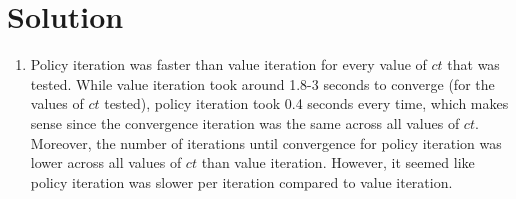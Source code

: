 \documentclass[submit]{../harvardml}
\newenvironment{solution}
  {\color{blue}\section*{Solution}}
{}
\begin{document}
\begin{solution}
\begin{enumerate}
\begin{enumerate}
\begin{figure}[htbp]
{              }\\
            \end{figure}
        \end{enumerate}

        \item Policy iteration was faster than value iteration for every value of $ct$ that was tested. While value iteration took around 1.8-3 seconds to converge (for the values of $ct$ tested), policy iteration took 0.4 seconds every time, which makes sense since the convergence iteration was the same across all values of $ct$. Moreover, the number of iterations until convergence for policy iteration was lower across all values of $ct$ than value iteration. However, it seemed like policy iteration was slower per iteration compared to value iteration.


\end{enumerate}
\end{solution}
\end{document}
